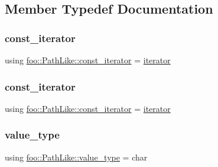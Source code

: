 \subsection{Member Typedef Documentation}
\mbox{\label{classfoo_1_1_path_like_adada0ee7aeec173026717604e6264b4c}} 
\subsubsection{\texorpdfstring{const\_iterator}{const\_iterator}\hspace{0.1cm}{\footnotesize\ttfamily [1/2]}}
{\footnotesize\ttfamily using \mbox{\hyperlink{classfoo_1_1_path_like_adada0ee7aeec173026717604e6264b4c}{foo\+::\+Path\+Like\+::const\+\_\+iterator}} =  \mbox{\hyperlink{structfoo_1_1_path_like_1_1iterator}{iterator}}}

\mbox{\label{classfoo_1_1_path_like_adada0ee7aeec173026717604e6264b4c}} 
\subsubsection{\texorpdfstring{const\_iterator}{const\_iterator}\hspace{0.1cm}{\footnotesize\ttfamily [2/2]}}
{\footnotesize\ttfamily using \mbox{\hyperlink{classfoo_1_1_path_like_adada0ee7aeec173026717604e6264b4c}{foo\+::\+Path\+Like\+::const\+\_\+iterator}} =  \mbox{\hyperlink{structfoo_1_1_path_like_1_1iterator}{iterator}}}

\mbox{\label{classfoo_1_1_path_like_aa828aab5ad4071dddf489067e7e06c5e}} 
\subsubsection{\texorpdfstring{value\_type}{value\_type}\hspace{0.1cm}{\footnotesize\ttfamily [1/2]}}
{\footnotesize\ttfamily using \mbox{\hyperlink{classfoo_1_1_path_like_aa828aab5ad4071dddf489067e7e06c5e}{foo\+::\+Path\+Like\+::value\+\_\+type}} =  char}

